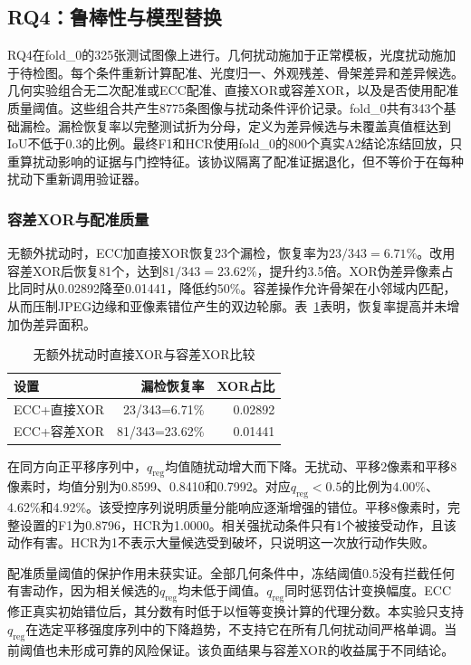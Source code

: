 \subsection{RQ4：鲁棒性与模型替换}
\label{subsec:rq4}

RQ4在fold\_0的325张测试图像上进行。几何扰动施加于正常模板，光度扰动施加于待检图。每个条件重新计算配准、光度归一、外观残差、骨架差异和差异候选。几何实验组合无二次配准或ECC配准、直接XOR或容差XOR，以及是否使用配准质量阈值。这些组合共产生8775条图像与扰动条件评价记录。fold\_0共有343个基础漏检。漏检恢复率以完整测试折为分母，定义为差异候选与未覆盖真值框达到IoU不低于0.3的比例。最终F1和HCR使用fold\_0的800个真实A2结论冻结回放，只重算扰动影响的证据与门控特征。该协议隔离了配准证据退化，但不等价于在每种扰动下重新调用验证器。

\subsubsection{容差XOR与配准质量}

无额外扰动时，ECC加直接XOR恢复23个漏检，恢复率为$23/343=6.71\%$。改用容差XOR后恢复81个，达到$81/343=23.62\%$，提升约3.5倍。XOR伪差异像素占比同时从0.02892降至0.01441，降低约50\%。容差操作允许骨架在小邻域内匹配，从而压制JPEG边缘和亚像素错位产生的双边轮廓。表~\ref{tab:rq4_xor}表明，恢复率提高并未增加伪差异面积。

\begin{table}[t]
  \centering
  \caption{无额外扰动时直接XOR与容差XOR比较}
  \label{tab:rq4_xor}
  \setlength{\tabcolsep}{4pt}
  \begin{tabular}{lrr}
    \hline
    设置 & 漏检恢复率 & XOR占比 \\
    \hline
    ECC+直接XOR & 23/343=6.71\% & 0.02892 \\
    ECC+容差XOR & 81/343=23.62\% & 0.01441 \\
    \hline
  \end{tabular}
\end{table}

在同方向正平移序列中，$q_{\mathrm{reg}}$均值随扰动增大而下降。无扰动、平移2像素和平移8像素时，均值分别为0.8599、0.8410和0.7992。对应$q_{\mathrm{reg}}<0.5$的比例为4.00\%、4.62\%和4.92\%。该受控序列说明质量分能响应逐渐增强的错位。平移8像素时，完整设置的F1为0.8796，HCR为1.0000。相关强扰动条件只有1个被接受动作，且该动作有害。HCR为1不表示大量候选受到破坏，只说明这一次放行动作失败。

配准质量阈值的保护作用未获实证。全部几何条件中，冻结阈值0.5没有拦截任何有害动作，因为相关候选的$q_{\mathrm{reg}}$均未低于阈值。$q_{\mathrm{reg}}$同时惩罚估计变换幅度。ECC修正真实初始错位后，其分数有时低于以恒等变换计算的代理分数。本实验只支持$q_{\mathrm{reg}}$在选定平移强度序列中的下降趋势，不支持它在所有几何扰动间严格单调。当前阈值也未形成可靠的风险保证。该负面结果与容差XOR的收益属于不同结论。

